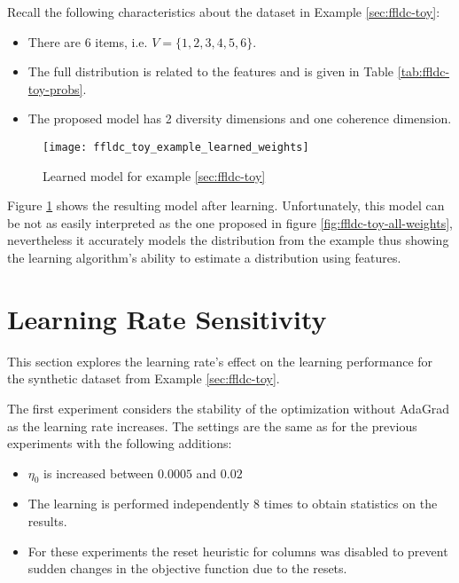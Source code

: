 Recall the following characteristics about the dataset in Example \ref{sec:ffldc-toy}:

\begin{itemize}
  \item There are 6 items, i.e. $V = \{1,2,3,4,5,6\}$.
  \item The full distribution is related to the features and is given in Table \ref{tab:ffldc-toy-probs}.
  \item The proposed model has 2 diversity dimensions and one coherence dimension.
\end{itemize}

\begin{figure}
  \centering
  \texttt{[image: ffldc\_toy\_example\_learned\_weights]}
  \caption{Learned model for example \ref{sec:ffldc-toy}}
  \label{fig:ffldc-toy-learned-weights}
\end{figure}

Figure \ref{fig:ffldc-toy-learned-weights} shows the resulting model after learning. Unfortunately, this model can be not as easily interpreted as the one proposed in figure \ref{fig:ffldc-toy-all-weights}, nevertheless it accurately models the distribution from the example thus showing the learning algorithm's ability to estimate a distribution using features.

\section{Learning Rate Sensitivity}

This section explores the learning rate's effect on the learning performance for the synthetic dataset from Example \ref{sec:ffldc-toy}.

The first experiment considers the stability of the optimization without AdaGrad as the learning rate increases. The settings are the same as for the previous experiments with the following additions:

\begin{itemize}
  \item $\eta_{0}$ is increased between $0.0005$ and $0.02$
  \item The learning is performed independently 8 times to obtain statistics on the results.
  \item For these experiments the reset heuristic for columns was disabled to prevent sudden changes in the objective function due to the resets.
\end{itemize}

